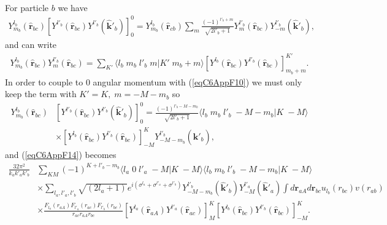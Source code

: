 \begin{subappendices}
\begin{equation}
\begin{split}
\end{split}
\end{equation}
For  particle $b$ we have
\begin{equation}\label{eqC6AppF15}
\begin{split}
Y^{l_b}_{m_b}(\hat{\mathbf{r}}_{bc})\left[ Y^{l'_b} (\hat{\mathbf r}_{bc}) Y^{l'_b} (\hat{ \mathbf k}'_{b})\right]^0_0=Y^{l_b}_{m_b}(\hat{\mathbf{r}}_{cb})\sum_m \frac{(-1)^{l'_b+m}}{\sqrt{2l'_b+1}}Y^{l'_b}_m (\hat{\mathbf r}_{bc})Y^{l'_b}_{-m} (\hat{ \mathbf k}'_{b}),
\end{split}
\end{equation}
and can write
\begin{equation}\label{eqC6AppG16}
\begin{split}
Y^{l_b}_{m_b}(\hat{\mathbf{r}}_{bc})Y^{l'_b}_m (\hat{\mathbf r}_{bc})=\sum_{K'}\langle l_b\;m_b\;l'_b\;m|K'\;m_b+m\rangle \left[ Y^{l_b} (\hat{\mathbf r}_{bc}) Y^{l'_b} (\hat{\mathbf r}_{bc})\right]^{K'}_{m_b+m}.
\end{split}
\end{equation}
In order to couple to 0 angular momentum with (\ref{eqC6AppF10}) we must only keep the term with  $K'=K,\;m=-M-m_b$ so
\begin{equation}\label{eqC6AppG17}
\begin{split}
Y^{l_b}_{m_b}(\hat{\mathbf{r}}_{bc})&\left[ Y^{l'_b} (\hat{\mathbf r}_{bc}) Y^{l'_b} (\hat{ \mathbf k}'_{b})\right]^0_0=\frac{(-1)^{l'_b-M-m_b}}{\sqrt{2l'_b+1}}\langle l_b\;m_b\;l'_b\;-M-m_b|K\;-M\rangle\\
&\times \left[ Y^{l_b} (\hat{\mathbf r}_{bc}) Y^{l'_b} (\hat{\mathbf r}_{bc})\right]^{K}_{-M}Y^{l'_b}_{-M-m_b} (\hat{ \mathbf k}'_{b}),
\end{split}
\end{equation}
and (\ref{eqC6AppF14}) becomes
\begin{equation}\label{eqC6AppG18}
\begin{split}
\frac{32\pi^2}{k_ak'_ak'_b}&\sum_{KM}(-1)^{K+l'_b-m_b}\langle l_a\;0\;l'_a\;-M|K\;-M\rangle\langle l_b\;m_b\;l'_b\;-M-m_b|K\;-M\rangle\\
&\times \sum_{l_a,l'_a,l'_b}\sqrt{(2l_a+1)} e^{i(\sigma^{l_a}+\sigma^{l'_a}+\sigma^{l'_b})}Y^{l'_b}_{-M-m_b} (\hat{ \mathbf k}'_{b}) Y^{l'_a}_{-M} (\hat{ \mathbf k}'_{a})\int d\mathbf{r}_{aA	}d \mathbf{r}_{bc}u_{l_b}(r_{bc})v(r_{ab}) \\
&\times\frac{F_{l_a}(r_{aA})  F_{l'_a}(r_{ac})F_{l'_b}(r_{bc})}{r_{ac}r_{aA}r_{bc}}\left[ Y^{l_a} (\hat{\mathbf r}_{aA}) Y^{l'_a} (\hat{ \mathbf r}_{ac})\right]^K_M   \left[ Y^{l_b} (\hat{\mathbf r}_{bc}) Y^{l'_b} (\hat{\mathbf r}_{bc})\right]^{K}_{-M}.

\end{split}
\end{equation}
\end{subappendices}
